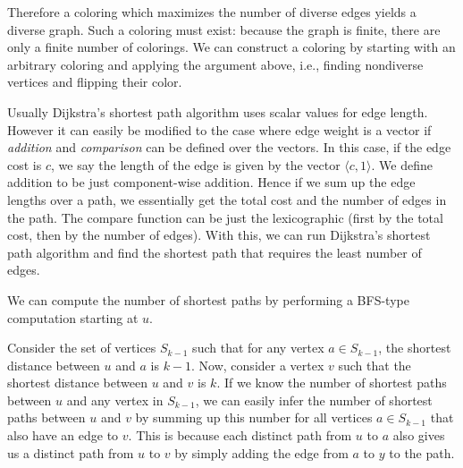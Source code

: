 Therefore a coloring which maximizes the number of diverse edges
yields a diverse graph. Such a coloring must exist: because the
graph is finite, there are only a finite number of colorings.
We can construct a coloring by starting with an arbitrary coloring 
and applying the argument above, i.e., finding nondiverse vertices
and flipping their color.


Usually Dijkstra's shortest path algorithm uses scalar values for edge
length. However it can easily be modified  to the case
where edge weight is a vector if {\em addition} and {\em comparison} can be defined over
the vectors. In this case, if the edge cost  is $c$, we
say the length of the edge is given by the vector  $\langle c, 1\rangle$. We define addition to be
just component-wise addition. Hence if we sum up the edge lengths over a
path, we essentially get the total cost and the number of edges in the
path. The compare function can be just the lexicographic (first by the total cost, then by the number of edges). With this, we can run Dijkstra's shortest path algorithm and find the shortest path that
requires the least number of edges.

\begin{comment}
A key step in Dijkstra's algorithm for single-source shortest paths
involves updating the shortest path estimates as the vertices are discovered.

Instead of storing shortest path length estimates, we can store
a shortest path estimate and the fewest number of edges
for this estimate.  We will record these in two arrays $d[x]$ and $w[x]$.

The process of relaxing the edge $(r,s)$
then updates the shortest path estimate as follows: if $d[r] + d(r,s) < d[s]$, then
$d[s] = d[r] + d(r,s)$ and $w[s] = w[r] + 1$; if  $d[r] + d(r,s) < d[s]$,
nothing  is updated;  and if  $d[r] + d(r,s) = d[s]$ and
$w[s] > w[r] + 1$, $w[s] = w[r] + 1$.

This has the same complexity as Dijkstra's algorithm but keeps track of
the fewest edges on a shortest path.
\end{comment}

We can compute the number of shortest paths by 
performing a BFS-type computation starting at $u$.

Consider the set of vertices $S_{k-1}$ such that for any vertex $a \in S_{k-1}$, the shortest
 distance between $u$ and $a$ is $k-1$. Now, consider a vertex $v$ such that the shortest distance
 between $u$ and $v$ is $k$. If we know the number of shortest paths between $u$ and any vertex in
 $S_{k-1}$, we can easily infer the number of shortest paths between $u$ and $v$ by summing up this
 number for all vertices $a \in S_{k-1}$ that also have an edge to $v$.  This is because each 
 distinct path from $u$ to $a$ also gives us a distinct path from $u$ to $v$ by simply adding the
 edge from $a$ to $y$ to the path. 

